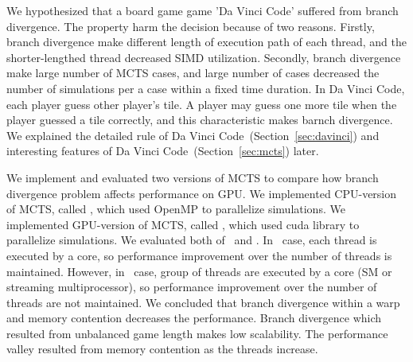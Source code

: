 We hypothesized that a board game game 'Da Vinci Code' suffered from branch divergence.
The property harm the decision because of two reasons.
Firstly, branch divergence make different length of execution path of each thread, and the shorter-lengthed thread decreased SIMD utilization.
Secondly, branch divergence make large number of MCTS cases, and large number of cases decreased the number of simulations per a case within a fixed time duration.
In Da Vinci Code, each player guess other player's tile.
A player may guess one more tile when the player guessed a tile correctly, and this characteristic makes barnch divergence.
We explained the detailed rule of Da Vinci Code~(Section~\ref{sec:davinci}) and interesting features of Da Vinci Code~(Section~\ref{sec:mcts}) later.


We implement and evaluated two versions of MCTS to compare how branch divergence problem affects performance on GPU.
We implemented CPU-version of MCTS, called \cpu, which used OpenMP to parallelize simulations.
We implemented GPU-version of MCTS, called \gpu, which used cuda library to parallelize simulations.
We evaluated both of \cpu~and \gpu.
In \cpu~case, each thread is executed by a core, so performance improvement over the number of threads is maintained.
However, in \gpu~case, group of threads are executed by a core (SM or streaming multiprocessor), so performance improvement over the number of threads are not maintained.
We concluded that branch divergence within a warp and memory contention decreases the performance.
Branch divergence which resulted from unbalanced game length makes low scalability.
The performance valley resulted from memory contention as the threads increase. 


